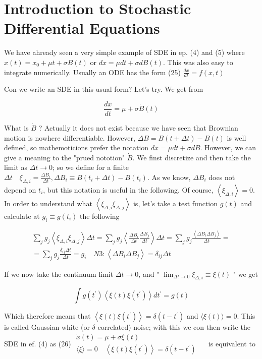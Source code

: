 \section{Introduction to Stochastic Differential Equations}
We have ahready seen a very simple example of SDE in ep. (4) and (5) where $x(t)=x_{0}+\mu t+\sigma B(t)$ or $d x=\mu d t+\sigma d B(t)$. This was also easy to integrate numerically. Usually an ODE has the form
(25) $\frac{d x}{d t}=f(x, t)$

Con we write an SDE in this usual form? Let's try. We get from

$$ \frac{d x}{d t}=\mu+\sigma \dot{B}(t) $$ 

What is $\dot{B}$ ? Actually it does not exist because we have seen that Brownian motion is nowhere differentiable. However, $\Delta B=B(t+\Delta t)-B(t)$ is well defined, so mathemoticions prefer the notation $d x=\mu d t+\sigma d B$. However, we can give a meaning to the "prued nototion" $\dot{B}$. We finst discretize and then take the limit as $\Delta t \rightarrow 0$; so we define for a finite $\Delta t \quad \xi_{\Delta, i}=\frac{\Delta B_{i}}{\Delta t}, \Delta B_{i} \equiv B\left(t_{i}+\Delta t\right)-B\left(t_{i}\right)$. As we know, $\Delta B_{i}$ does not depend on $t_{i}$, but this notation is useful in the following. Of course, $\left\langle\xi_{\Delta, i}\right\rangle=0$. In order to understand what $\left\langle\xi_{\Delta, i} \xi_{\Delta, j}\right\rangle$ is, let's take a test function $g(t)$ and calculate at $g_{i} \equiv g\left(t_{i}\right)$ the following

$$
\begin{gathered} 
\sum_{j} g_{j}\left\langle\xi_{\Delta, i} \xi_{\Delta, j}\right\rangle \Delta t=\sum_{j} g_{j}\left\langle\frac{\Delta B_{i}}{\Delta t} \frac{\Delta B_{j}}{\Delta t}\right\rangle \Delta t=\sum_{j} g_{j} \frac{\left\langle\Delta B_{i} \Delta B_{j}\right\rangle}{\Delta t}= \\ 
=\sum_{j} g_{j} \frac{\delta_{i j} \Delta t}{\Delta t}=g_{i} \quad N 3:\left\langle\Delta B_{i} \Delta B_{j}\right\rangle=\delta_{i j} \Delta t 
\end{gathered}
$$ 

If we now take the continuum limit $\Delta t \rightarrow 0$, and " $\lim _{\Delta t \rightarrow 0} \xi_{\Delta, i} \equiv \xi(t)$ " we get

$$
\int g\left(t^{\prime}\right)\left\langle\xi(t) \xi\left(t^{\prime}\right)\right\rangle d t^{\prime}=g(t)
$$ 

Which therefore means that $\left\langle\xi(t) \xi\left(t^{\prime}\right)\right\rangle=\delta\left(t-t^{\prime}\right)$ and $\langle\xi(t)\rangle=0$. This is called Gaussian white (or $\delta$-correlated) noise; with this we con then write the SDE in ef. (4) as
(26) $\begin{gathered}
\dot{x}(t)=\mu+\sigma \xi(t) \\
\langle\xi\rangle=0 \quad\left\langle\xi(t) \xi\left(t^{\prime}\right)\right\rangle=\delta\left(t-t^{\prime}\right)\end{gathered} \quad$ is equivalent to

